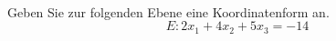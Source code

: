 \begin{aufgabe} ~ \\ 
Geben Sie zur folgenden Ebene eine Koordinatenform an.\[E: 2x_1 + 4x_2 + 5x_3 = -14\]\end{aufgabe} 
